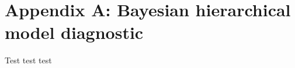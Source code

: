\section{Appendix A: Bayesian hierarchical model diagnostic}
\label{sec:modeldiagnostic}

Test test test

